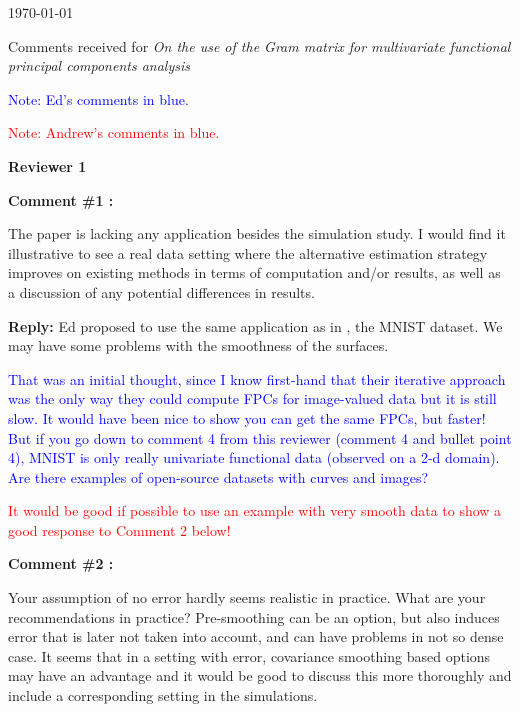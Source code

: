 \documentclass[11pt]{article}
\begin{document}
\newcommand{\thedate}{\today}

\thedate


\begin{center}
{\large Comments received for \emph{On the use of the Gram matrix for multivariate functional principal components analysis}}\\
\end{center} 

\textcolor{blue}{Note: Ed’s comments in blue.}

\textcolor{red}{Note: Andrew’s comments in blue.}

\vspace*{1cm}


{\large \textbf{Reviewer 1} }


\bigskip

\itshape


\textbf{Comment \#1 :}

The paper is lacking any application besides the simulation study. I would find it illustrative to see a real data setting where the alternative estimation strategy improves on existing methods in terms of computation and/or results, as well as a discussion of any potential differences in results.

\medskip

\normalfont

\textbf{Reply:} Ed proposed to use the same application as in \cite{shiTwoDimensionalFunctionalPrincipal2022}, the MNIST dataset. We may have some problems with the smoothness of the surfaces.

\textcolor{blue}{That was an initial thought, since I know first-hand that their iterative approach was the only way they could compute FPCs for image-valued data but it is still slow. It would have been nice to show you can get the same FPCs, but faster! But if you go down to comment 4 from this reviewer (comment 4 and bullet point 4), MNIST is only really univariate functional data (observed on a 2-d domain). Are there examples of open-source datasets with curves and images?}

\textcolor{red}{It would be good if possible to use an example with very smooth data to show a good response to Comment 2 below!}

\bigskip

\itshape

\textbf{Comment \#2 :}

Your assumption of no error hardly seems realistic in practice. What are your recommendations in practice? Pre-smoothing can be an option, but also induces error that is later not taken into account, and can have problems in not so dense case. It seems that in a setting with error, covariance smoothing based options may have an advantage and it would be good to discuss this more thoroughly and include a corresponding setting in the simulations.
\end{document}
